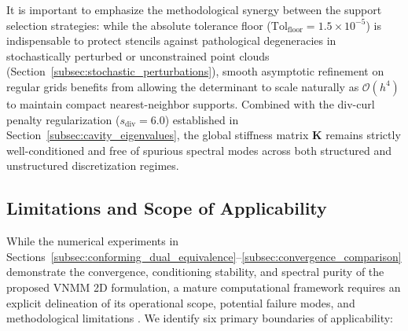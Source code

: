 \documentclass[preprint,12pt]{elsarticle}
\begin{document}
It is important to emphasize the methodological synergy between the support selection strategies: while the absolute tolerance floor ($\mathrm{Tol}_{\mathrm{floor}} = 1.5 \times 10^{-5}$) is indispensable to protect stencils against pathological degeneracies in stochastically perturbed or unconstrained point clouds (Section~\ref{subsec:stochastic_perturbations}), smooth asymptotic refinement on regular grids benefits from allowing the determinant to scale naturally as $\mathcal{O}(h^4)$ to maintain compact nearest-neighbor supports. Combined with the div-curl penalty regularization ($s_{\mathrm{div}} = 6.0$) established in Section~\ref{subsec:cavity_eigenvalues}, the global stiffness matrix $\mathbf{K}$ remains strictly well-conditioned and free of spurious spectral modes across both structured and unstructured discretization regimes.

\subsection{Limitations and Scope of Applicability}
\label{subsec:limitations_scope}

While the numerical experiments in Sections~\ref{subsec:conforming_dual_equivalence}--\ref{subsec:convergence_comparison} demonstrate the convergence, conditioning stability, and spectral purity of the proposed VNMM 2D formulation, a mature computational framework requires an explicit delineation of its operational scope, potential failure modes, and methodological limitations \cite{slak2018refined}. We identify six primary boundaries of applicability:
\end{document}
